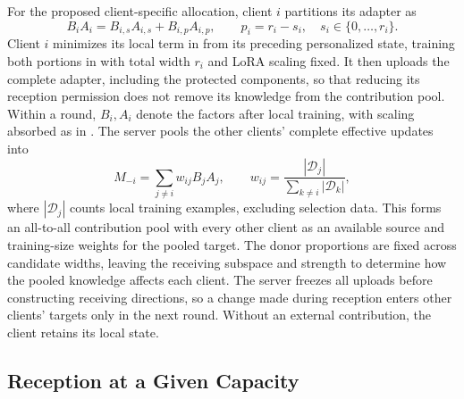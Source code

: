 For the proposed client-specific allocation, client $i$ partitions its adapter as
\begin{equation}
    B_iA_i=B_{i,s}A_{i,s}+B_{i,p}A_{i,p},
    \qquad p_i=r_i-s_i,\quad s_i\in\{0,\ldots,r_i\}.
    \label{equ:capacity-partition}
\end{equation}
Client $i$ minimizes its local term in  from its preceding personalized state, training both portions in  with total width $r_i$ and LoRA scaling fixed.
It then uploads the complete adapter, including the protected components, so that reducing its reception permission does not remove its knowledge from the contribution pool.
Within a round, $B_i,A_i$ denote the factors after local training, with scaling absorbed as in .
The server pools the other clients' complete effective updates into
\begin{equation}
    M_{-i}=\sum_{j\ne i}w_{ij}B_jA_j,
    \qquad
    w_{ij}=\frac{|\mathcal{D}_j|}{\sum_{k\ne i}|\mathcal{D}_k|},
    \label{equ:acl-target}
\end{equation}
where $|\mathcal{D}_j|$ counts local training examples, excluding selection data.
This forms an all-to-all contribution pool with every other client as an available source and training-size weights for the pooled target.
The donor proportions are fixed across candidate widths, leaving the receiving subspace and strength to determine how the pooled knowledge affects each client.
The server freezes all uploads before constructing receiving directions, so a change made during reception enters other clients' targets only in the next round.
Without an external contribution, the client retains its local state.

\subsection{Reception at a Given Capacity}
\label{sec:method:collaboration}

